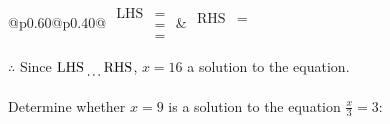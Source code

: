 \documentclass[12pt]{article}
\newcounter{minipagecount}
\begin{document}
\begin{multicols}{2}
\begin{minipage}[t]{0.40\textwidth}
    \noindent
    \renewcommand{\arraystretch}{1.3} %
    \begin{tabular}{@{}p{0.60\linewidth}@{}p{0.40\linewidth}@{}}
        \(\begin{aligned}
            \text{LHS} &=  \\
                    &=  \\
                    &= 
        \end{aligned}\) &
        \(\begin{aligned}
            \text{RHS} &= \\
                    & \\
                    &
        \end{aligned}\)
    \end{tabular}
    \renewcommand{\arraystretch}{1.0} %
    \vspace{2pt}  %

    \noindent \(\therefore\) Since \(\text{LHS} \dotuline{\hspace{5mm}} \text{RHS}\), \(x = 16\) \dotuline{\hspace{12mm}} a solution to the equation.

\end{minipage}

\vspace*{0.5ex}
\vfill{}
\noindent{(\theminipagecount)}\hspace{0.1mm} %
\begin{minipage}[t]{0.40\textwidth} %

    \noindent Determine whether \(x = 9\) is a solution to the equation \(\frac{x}{3} = 3\):
    \vspace{2pt}  %


\end{minipage}
\end{multicols}
\end{document}
